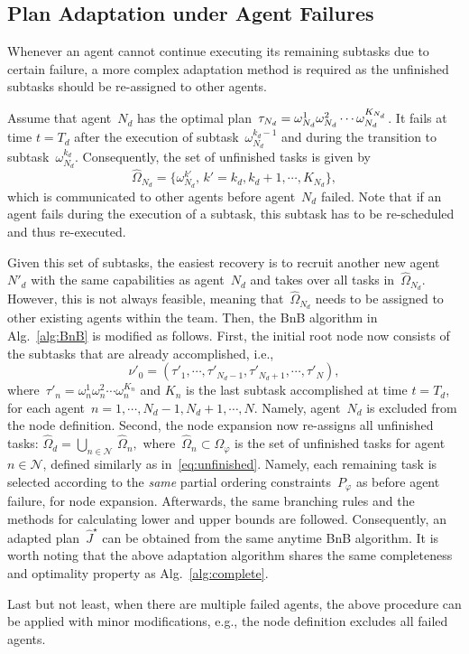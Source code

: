 \subsection{Plan Adaptation under Agent Failures}\label{subsubsec:failure}
Whenever an agent cannot continue executing its remaining subtasks due to certain failure,
a more complex adaptation method is required as the unfinished subtasks
should be re-assigned to other agents.


Assume that agent~$N_d$ has the optimal
plan~$\tau_{N_d}=\omega^1_{N_d}\omega^2_{N_d}\\\cdots \omega^{K_{N_d}}_{N_d}$.
It fails at time $t=T_d$ after the execution of subtask~$\omega^{k_d-1}_{N_d}$ and during the
transition to subtask~$\omega^{k_d}_{N_d}$.
Consequently, the set of unfinished tasks is given by
\begin{equation}\label{eq:unfinished}
\widehat{\Omega}_{N_d}=\{\omega^{k'}_{N_d},\,k'=k_d,k_d+1,\cdots,K_{N_d}\},
\end{equation}
which is communicated to other agents before agent~$N_d$ failed.
Note that if an agent fails during the execution of a subtask,
this subtask has to be re-scheduled and thus re-executed.


Given this set of subtasks, the easiest recovery is to recruit another new
agent~$N'_d$ with the same capabilities as agent~$N_d$ and
takes over all tasks in~$\widehat{\Omega}_{N_d}$.
However, this is not always feasible, meaning that~$\widehat{\Omega}_{N_d}$ needs to
be assigned to other existing agents within the team.
Then, the BnB algorithm in Alg.~\ref{alg:BnB} is modified as follows.
First, the initial root node now consists of the subtasks that are already
accomplished, i.e.,
\begin{equation}\label{eq:new-initial}
  \nu'_0=(\tau'_1,\cdots,\tau'_{N_d-1},\tau'_{N_d+1},\cdots,\tau'_{N}),
\end{equation}
where~$\tau'_n=\omega^1_n \omega^2_n\cdots \omega^{K_n}_n$ and $K_n$ is the last
subtask accomplished at time $t=T_d$,
for each agent~$n=1,\cdots,N_d-1,N_d+1,\cdots,N$.
Namely, agent~$N_d$ is excluded from the node definition.
Second, the node expansion now re-assigns all unfinished tasks:
$
  \widehat{\Omega}_d= \bigcup_{n\in \mathcal{N}}\,\widehat{\Omega}_n,
$
where~$\widehat{\Omega}_n\subset \Omega_{\varphi}$ is the set of unfinished tasks
for agent~$n\in \mathcal{N}$, defined similarly as in~\eqref{eq:unfinished}.
Namely, each remaining task is selected according to the \emph{same} partial
ordering constraints~$P_{\varphi}$ as before agent failure, for node expansion.
Afterwards, the same branching rules and 
the methods for calculating lower and upper bounds are followed.
Consequently, an adapted plan~$\widehat{J}^\star$ can be obtained
from the same anytime BnB algorithm.
It is worth noting that the above adaptation algorithm shares the same
completeness and optimality property as Alg.~\ref{alg:complete}.

Last but not least, when there are multiple failed agents, the above procedure
can be applied with minor modifications, e.g., the node definition excludes
all failed agents.
